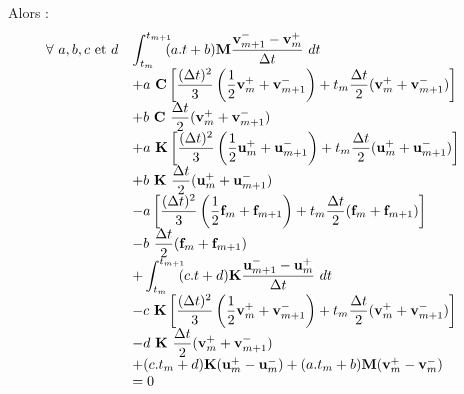 \documentclass[12pt,a4paper]{report}
\begin{document}
Alors :
\begin{equation}
\begin{array}{r l}
	\!\!\!\!\!\! \forall~a,b,c \text{ et }d
	&\displaystyle
		 \int_{t_m}^{t_{m+1}} \!\!\! 	(a.t+b)
			\mathbf{M}\frac{\mathbf{v}^-_{m+1} - \mathbf{v}^+_m}
							{\Delta t} ~dt
	\\ &+\displaystyle
		a ~\mathbf{C} \left[
			\frac{(\Delta t)^2}{3}
				\left( \frac{1}{2} \mathbf{v}_m^+ + \mathbf{v}_{m+1}^- \right)
			+t_m \frac{\Delta t}{2} (\mathbf{v}_m^+ + \mathbf{v}_{m+1}^-) 
		\right]
	\\ &+\displaystyle
		 b~ \mathbf{C}~ 
		 	\frac{\Delta t}{2}  (\mathbf{v}_m^+ + \mathbf{v}_{m+1}^-)
	\\ &+\displaystyle
		a ~\mathbf{K} 
		\left[
			\frac{(\Delta t)^2}{3}
				\left( \frac{1}{2} \mathbf{u}_m^+ + \mathbf{u}_{m+1}^- \right)
			+t_m \frac{\Delta t}{2} (\mathbf{u}_m^+ + \mathbf{u}_{m+1}^-) 
		\right]
	\\ &+\displaystyle
		 b~ \mathbf{K}~ \frac{\Delta t}{2}  (\mathbf{u}_m^+ + \mathbf{u}_{m+1}^-)
	\\ &-\displaystyle
		a \left[
			\frac{(\Delta t)^2}{3}
				\left( \frac{1}{2} \mathbf{f}_m + \mathbf{f}_{m+1} \right)
			+t_m \frac{\Delta t}{2} (\mathbf{f}_m + \mathbf{f}_{m+1}) 
		\right]
	\\ &-\displaystyle
		 b~ \frac{\Delta t}{2}  (\mathbf{f}_m + \mathbf{f}_{m+1})
	\\ &\displaystyle	
	   + \int_{t_m}^{t_{m+1}} \!\!\! 
	    	(c.t+d) \mathbf{K}\frac{\mathbf{u}^-_{m+1} - \mathbf{u}^+_m}
	    							{\Delta t}~dt 
	\\ &-\displaystyle
		c ~\mathbf{K} \left[
			\frac{(\Delta t)^2}{3}
				\left( \frac{1}{2} \mathbf{v}_m^+ + \mathbf{v}_{m+1}^- \right)
			+t_m \frac{\Delta t}{2} (\mathbf{v}_m^+ + \mathbf{v}_{m+1}^-) 
		\right]
	\\ &-\displaystyle
		 d~ \mathbf{K}~ \frac{\Delta t}{2}  (\mathbf{v}_m^+ + \mathbf{v}_{m+1}^-)
	\\
	  &+ (c.t_m+d) \mathbf{K} (\mathbf{u}_m^+ - \mathbf{u}_m^-)
	   +  (a.t_m+b) \mathbf{M}(\mathbf{v}_m^+ - \mathbf{v}_m^-)
	\\&=0
\end{array}
\end{equation}
\end{document}
